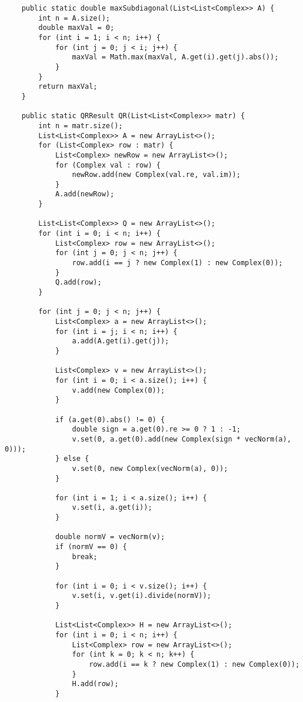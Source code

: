 \begin{verbatim}
    public static double maxSubdiagonal(List<List<Complex>> A) {
        int n = A.size();
        double maxVal = 0;
        for (int i = 1; i < n; i++) {
            for (int j = 0; j < i; j++) {
                maxVal = Math.max(maxVal, A.get(i).get(j).abs());
            }
        }
        return maxVal;
    }

    public static QRResult QR(List<List<Complex>> matr) {
        int n = matr.size();
        List<List<Complex>> A = new ArrayList<>();
        for (List<Complex> row : matr) {
            List<Complex> newRow = new ArrayList<>();
            for (Complex val : row) {
                newRow.add(new Complex(val.re, val.im));
            }
            A.add(newRow);
        }

        List<List<Complex>> Q = new ArrayList<>();
        for (int i = 0; i < n; i++) {
            List<Complex> row = new ArrayList<>();
            for (int j = 0; j < n; j++) {
                row.add(i == j ? new Complex(1) : new Complex(0));
            }
            Q.add(row);
        }

        for (int j = 0; j < n; j++) {
            List<Complex> a = new ArrayList<>();
            for (int i = j; i < n; i++) {
                a.add(A.get(i).get(j));
            }

            List<Complex> v = new ArrayList<>();
            for (int i = 0; i < a.size(); i++) {
                v.add(new Complex(0));
            }

            if (a.get(0).abs() != 0) {
                double sign = a.get(0).re >= 0 ? 1 : -1;
                v.set(0, a.get(0).add(new Complex(sign * vecNorm(a), 0)));
            } else {
                v.set(0, new Complex(vecNorm(a), 0));
            }

            for (int i = 1; i < a.size(); i++) {
                v.set(i, a.get(i));
            }

            double normV = vecNorm(v);
            if (normV == 0) {
                break;
            }

            for (int i = 0; i < v.size(); i++) {
                v.set(i, v.get(i).divide(normV));
            }

            List<List<Complex>> H = new ArrayList<>();
            for (int i = 0; i < n; i++) {
                List<Complex> row = new ArrayList<>();
                for (int k = 0; k < n; k++) {
                    row.add(i == k ? new Complex(1) : new Complex(0));
                }
                H.add(row);
            }


\end{verbatim}

